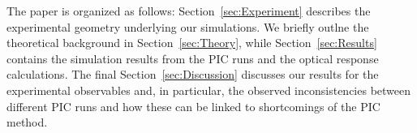 \documentclass[preprint, 12pt]{elsarticle}
\begin{document}
The paper is organized as follows:
Section~\ref{sec:Experiment} describes the experimental geometry underlying our
simulations. We briefly outlne the theoretical background in
Section~\ref{sec:Theory}, while
Section~\ref{sec:Results} contains the simulation results
from the PIC runs and the optical response calculations. The final
Section~\ref{sec:Discussion} discusses our results for the experimental
observables and, in particular,
the observed inconsistencies between different PIC runs and how these can be
linked to shortcomings of the PIC method.

%
\end{document}
